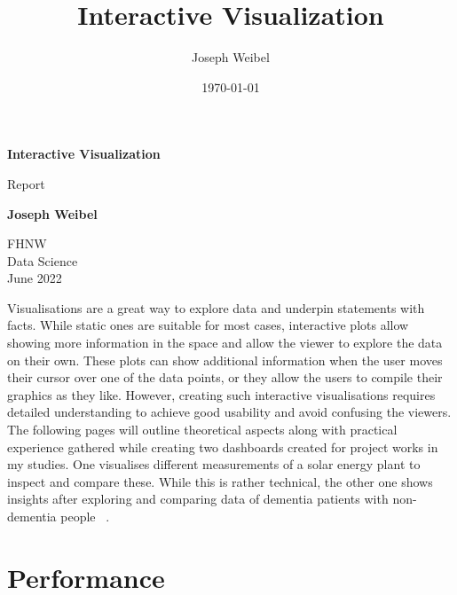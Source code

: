 \documentclass[11pt]{article}
\title{Interactive Visualization}
\author{Joseph Weibel}
\date{\today}
\begin{document}
\begin{titlepage}
    \begin{center}
        \vspace*{0.4cm}

        \Huge
        \textbf{Interactive Visualization}

        \vspace{0.3cm}
        \LARGE
        Report

        \vspace{0.8cm}

        \textbf{Joseph Weibel}

        \vfill


        \vfill

        \vspace{0.3cm}

        \Large
        FHNW\\
        Data Science\\
        June 2022

        \vspace{2.0cm}

    \end{center}
\end{titlepage}
\pagebreak

\tableofcontents
\pagebreak

Visualisations are a great way to explore data and underpin statements with facts. While static ones are suitable for most cases, interactive plots allow showing more information in the space and allow the viewer to explore the data on their own. These plots can show additional information when the user moves their cursor over one of the data points, or they allow the users to compile their graphics as they like. However, creating such interactive visualisations requires detailed understanding to achieve good usability and avoid confusing the viewers. The following pages will outline theoretical aspects along with practical experience gathered while creating two dashboards created for project works in my studies. One visualises different measurements of a solar energy plant to inspect and compare these. While this is rather technical, the other one shows insights after exploring and comparing data of dementia patients with non-dementia people ~\parencite{alzheimers_disease_neuroimaging_initiative_adni_2022}.

\section{Performance}
\end{document}
